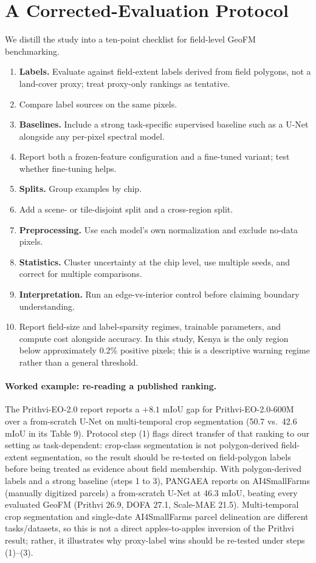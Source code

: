 \documentclass{article}
\begin{document}
\FloatBarrier
\section{A Corrected-Evaluation Protocol}
\label{sec:protocol}
We distill the study into a ten-point checklist for field-level GeoFM benchmarking.
\begin{enumerate}
\item \textbf{Labels.} Evaluate against field-extent labels derived from field
polygons, not a land-cover proxy; treat proxy-only rankings as tentative.
\item Compare label sources on the same pixels.
\item \textbf{Baselines.} Include a strong task-specific supervised baseline
such as a U-Net alongside any per-pixel spectral model.
\item Report both a frozen-feature configuration and a fine-tuned variant; test
whether fine-tuning helps.
\item \textbf{Splits.} Group examples by chip.
\item Add a scene- or tile-disjoint split and a cross-region split.
\item \textbf{Preprocessing.} Use each model's own normalization and exclude
no-data pixels.
\item \textbf{Statistics.} Cluster uncertainty at the chip level, use multiple
seeds, and correct for multiple comparisons.
\item \textbf{Interpretation.} Run an edge-vs-interior control before claiming
boundary understanding.
\item Report field-size and label-sparsity regimes, trainable parameters, and
compute cost alongside accuracy. In this study, Kenya is the only region below
approximately 0.2\% positive pixels; this is a descriptive warning regime rather
than a general threshold.
\end{enumerate}

\paragraph{Worked example: re-reading a published ranking.} The Prithvi-EO-2.0 report
\citep{prithvi} reports a $+8.1$ mIoU gap for Prithvi-EO-2.0-600M over a
from-scratch U-Net on multi-temporal crop segmentation (50.7 vs.\ 42.6 mIoU in
its Table 9). Protocol step (1) flags direct transfer of that ranking to our
setting as task-dependent: crop-class segmentation is not polygon-derived
field-extent segmentation, so the result should be re-tested on field-polygon
labels before being treated as evidence about field membership. With
polygon-derived labels and a
strong baseline (steps 1 to 3), PANGAEA \citep{pangaea} reports on AI4SmallFarms
\citep{ai4smallfarms} (manually digitized parcels) a from-scratch U-Net at 46.3
mIoU, beating every evaluated GeoFM (Prithvi 26.9, DOFA 27.1, Scale-MAE 21.5).
Multi-temporal crop segmentation and single-date AI4SmallFarms parcel
delineation are different tasks/datasets, so this is not a direct apples-to-apples
inversion of the Prithvi result; rather, it illustrates why proxy-label wins
should be re-tested under steps (1)--(3).
\end{document}
